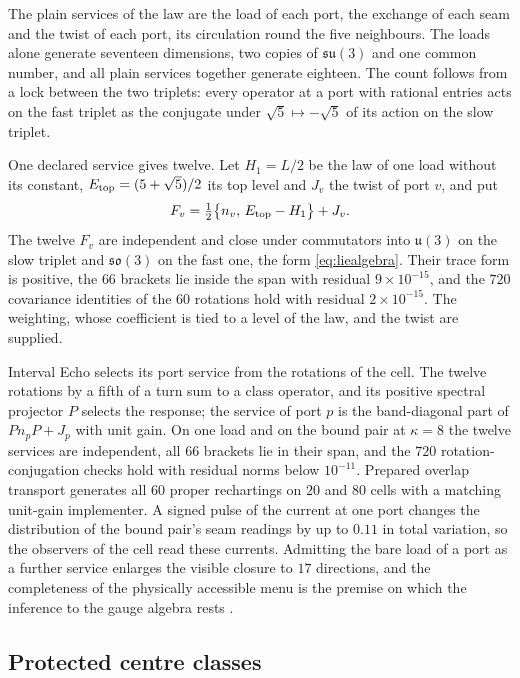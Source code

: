 \documentclass[11pt]{article}
\theoremstyle{definition}
\theoremstyle{remark}
\begin{document}
The plain services of the law are the load of each port, the exchange of
each seam and the twist of each port, its circulation round the five
neighbours. The loads alone generate seventeen dimensions, two copies of
$\mathfrak{su}(3)$ and one common number, and all plain services together
generate eighteen. The count follows from a lock between the two triplets:
every operator at a port with rational entries acts on the fast triplet as
the conjugate under $\sqrt5\mapsto-\sqrt5$ of its action on the slow
triplet.

One declared service gives twelve. Let $H_1=L/2$ be the law of one load
without its constant, $E_{\rm top}=(5+\sqrt5)/2$ its top level and $J_v$
the twist of port $v$, and put
\begin{equation}
 F_v=\tfrac12\bigl\{n_v,\,E_{\rm top}-H_1\bigr\}+J_v .
\label{eq:declared-service}
\end{equation}
The twelve $F_v$ are independent and close under commutators into
$\mathfrak u(3)$ on the slow triplet and $\mathfrak{so}(3)$ on the fast
one, the form \eqref{eq:liealgebra}. Their trace form is positive, the
$66$ brackets lie inside the span with residual $9\times10^{-15}$, and the
$720$ covariance identities of the $60$ rotations hold with residual
$2\times10^{-15}$. The weighting, whose coefficient is tied to a level of
the law, and the twist are supplied.

Interval Echo selects its port service from the rotations of the cell. The
twelve rotations by a fifth of a turn sum to a class operator, and its
positive spectral projector $P$ selects the response; the service of port
$p$ is the band-diagonal part of $Pn_pP+J_p$ with unit gain. On one load
and on the bound pair at $\kappa=8$ the twelve services are independent,
all $66$ brackets lie in their span, and the $720$ rotation-conjugation
checks hold with residual norms below $10^{-11}$. Prepared overlap
transport generates all $60$ proper rechartings on $20$ and $80$ cells with
a matching unit-gain implementer. A signed pulse of the current at one port
changes the distribution of the bound pair's seam readings by up to $0.11$
in total variation, so the observers of the cell read these currents.
Admitting the bare load of a port as a further service enlarges the visible
closure to $17$ directions, and the completeness of the physically
accessible menu is the premise on which the inference to the gauge algebra
rests \cite{ophmodel}.

\subsection{Protected centre classes}
\label{sec:defect-families}
\end{document}
